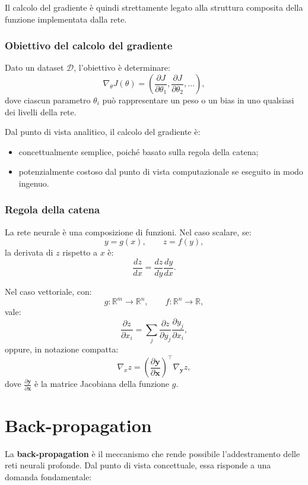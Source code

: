 \documentclass[a4paper,12pt]{report}
\begin{document}
Il calcolo del gradiente è quindi strettamente legato alla struttura composita della funzione implementata dalla rete.

\subsubsection{Obiettivo del calcolo del gradiente}

Dato un dataset $\mathcal{D}$, l’obiettivo è determinare:
\[
\nabla_{\theta} J(\theta) =
\left(
\frac{\partial J}{\partial \theta_1},
\frac{\partial J}{\partial \theta_2},
\dots
\right),
\]
dove ciascun parametro $\theta_i$ può rappresentare un peso o un bias in uno qualsiasi dei livelli della rete.

Dal punto di vista analitico, il calcolo del gradiente è:
\begin{itemize}
    \item concettualmente semplice, poiché basato sulla regola della catena;
    \item potenzialmente costoso dal punto di vista computazionale se eseguito in modo ingenuo.
\end{itemize}

\subsubsection{Regola della catena}

La rete neurale è una composizione di funzioni.  
Nel caso scalare, se:
\[
y = g(x),
\qquad
z = f(y),
\]
la derivata di $z$ rispetto a $x$ è:
\[
\frac{dz}{dx} = \frac{dz}{dy} \frac{dy}{dx}.
\]

Nel caso vettoriale, con:
\[
g : \mathbb{R}^m \rightarrow \mathbb{R}^n,
\qquad
f : \mathbb{R}^n \rightarrow \mathbb{R},
\]
vale:
\[
\frac{\partial z}{\partial x_i}
=
\sum_{j}
\frac{\partial z}{\partial y_j}
\frac{\partial y_j}{\partial x_i},
\]
oppure, in notazione compatta:
\[
\nabla_x z =
\left(
\frac{\partial \mathbf{y}}{\partial \mathbf{x}}
\right)^{\!\top}
\nabla_{\mathbf{y}} z,
\]
dove $\frac{\partial \mathbf{y}}{\partial \mathbf{x}}$ è la matrice Jacobiana della funzione $g$.

\section{ Back-propagation}

La \textbf{back-propagation} è il meccanismo che rende possibile l’addestramento delle reti neurali profonde.  
Dal punto di vista concettuale, essa risponde a una domanda fondamentale:
\end{document}

